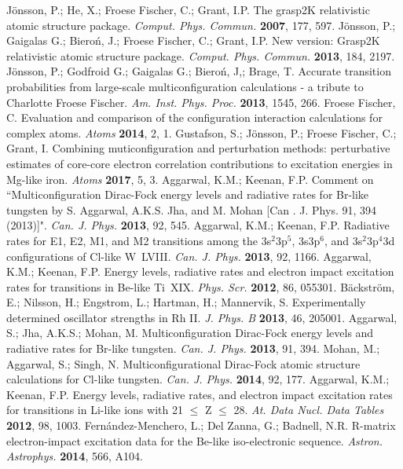 \documentclass[fleqn]{article}
\begin{document}
\begin{thebibliography}{999}
 J\"{o}nsson, P.; He, X.; Froese Fischer, C.; Grant, I.P.  The grasp2K relativistic atomic structure package. {\em Comput. Phys. Commun.} {\bf 2007}, 177, 597.
 J\"{o}nsson, P.; Gaigalas G.;  Biero\'{n}, J.;  Froese Fischer, C.; Grant, I.P.  New version: Grasp2K relativistic atomic structure package. {\em Comput. Phys. Commun.} {\bf 2013}, 184, 2197.
 J\"{o}nsson, P.; Godfroid G.; Gaigalas G.; Biero\'{n}, J,; Brage, T. Accurate transition probabilities from large-scale multiconfiguration calculations - a tribute to Charlotte Froese Fischer.  {\em Am. Inst. Phys. Proc.} {\bf 2013}, 1545, 266.
 Froese Fischer, C. Evaluation and comparison of the configuration interaction calculations for complex atoms.  {\em Atoms} {\bf 2014}, 2, 1.
 Gustafson, S.; J\"{o}nsson, P.; Froese Fischer, C.; Grant, I. Combining muticonfiguration and perturbation methods: perturbative estimates of core-core electron correlation contributions to excitation energies in Mg-like iron. {\em Atoms} {\bf 2017}, 5, 3.
 Aggarwal, K.M.; Keenan, F.P. Comment on ``Multiconfiguration Dirac-Fock energy levels and radiative rates for Br-like tungsten by S. Aggarwal, A.K.S. Jha, and M. Mohan [Can . J. Phys. 91, 394 (2013)]". {\em Can. J. Phys.} {\bf 2013}, 92, 545.
 Aggarwal, K.M.; Keenan, F.P. Radiative rates for E1, E2, M1, and M2 transitions among the 3s$^2$3p$^5$, 3s3p$^6$, and 3s$^2$3p$^4$3d configurations of Cl-like W~LVIII.  {\em Can. J. Phys.} {\bf 2013}, 92, 1166.
 Aggarwal, K.M.; Keenan, F.P. Energy levels, radiative rates and electron impact excitation rates for transitions in Be-like Ti~XIX. {\em Phys. Scr.} {\bf 2012}, 86, 055301.
 B\"{a}ckstr\"{o}m, E.; Nilsson, H.;  Engstrom, L.;  Hartman, H.; Mannervik, S.  Experimentally determined oscillator strengths in Rh II. {\em J. Phys. B} {\bf 2013}, 46, 205001.
 Aggarwal, S.; Jha, A.K.S.; Mohan, M. Multiconfiguration Dirac-Fock energy levels and radiative rates for Br-like tungsten. {\em Can. J. Phys.} {\bf 2013}, 91, 394.
 Mohan, M.; Aggarwal, S.; Singh, N.   Multiconfigurational Dirac-Fock atomic structure calculations for Cl-like tungsten.   {\em Can. J. Phys.} {\bf 2014}, 92, 177.
   Aggarwal, K.M.; Keenan, F.P.  Energy levels, radiative rates, and electron impact excitation rates for transitions in Li-like ions with 21 $\le$ Z $\le$ 28. {\em  At. Data Nucl. Data Tables} {\bf 2012}, 98, 1003.
 Fern{\'a}ndez-Menchero, L.; Del Zanna, G.; Badnell, N.R. R-matrix electron-impact excitation data for the Be-like iso-electronic sequence. {\em Astron. Astrophys.} {\bf 2014}, 566, A104.

\end{thebibliography}
\end{document}
